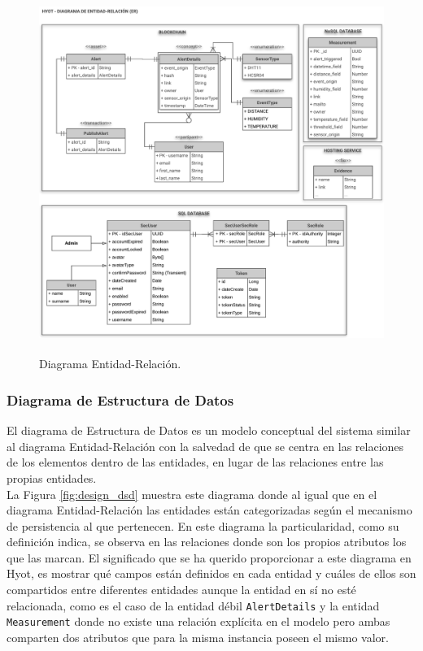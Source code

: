\documentclass[12pt,a4paper, twoside]{report}
\begin{document}
	\begin{figure}[!ht]   
		\caption{Diagrama Entidad-Relación.} 
		\begin{center} 
			\includegraphics[width=17cm,height=11cm]{Images/design/p_er} \\
			\label{fig:design_er} 
		\end{center}  
	\end{figure}
	
	\subsubsection{Diagrama de Estructura de Datos}
	
	El diagrama de Estructura de Datos es un modelo conceptual del sistema similar al diagrama Entidad-Relación con la salvedad de que se centra en las relaciones de los elementos dentro de las entidades, en lugar de las relaciones entre las propias entidades. \\
	
	La Figura \ref{fig:design_dsd} muestra este diagrama donde al igual que en el diagrama Entidad-Relación las entidades están categorizadas según el mecanismo de persistencia al que pertenecen. En este diagrama la particularidad, como su definición indica, se observa en las relaciones donde son los propios atributos los que las marcan. El significado que se ha querido proporcionar a este diagrama en Hyot, es mostrar qué campos están definidos en cada entidad y cuáles de ellos son compartidos entre diferentes entidades aunque la entidad en sí no esté relacionada, como es el caso de la entidad débil \texttt{AlertDetails} y la entidad \texttt{Measurement} donde no existe una relación explícita en el modelo pero ambas comparten dos atributos que para la misma instancia poseen el mismo valor.
	
\end{document}
